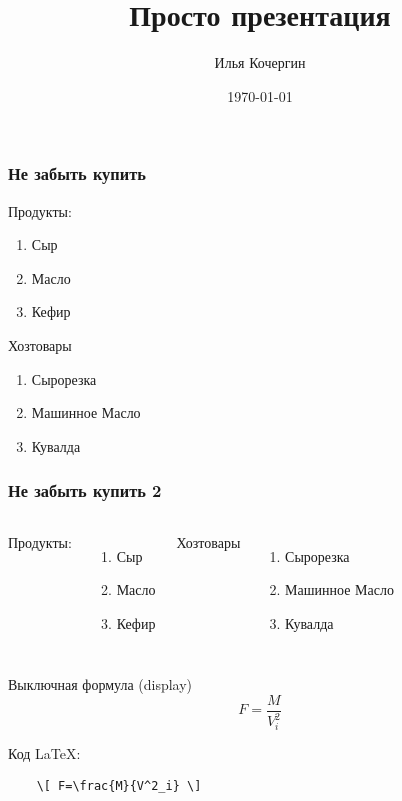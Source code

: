 \documentclass{beamer}
\author{Илья Кочергин}
\date{\today}
\title{Просто презентация}
\begin{document}
	
\begin{frame}
	\titlepage
\end{frame}	


\begin{frame}
	
\frametitle{Не забыть купить}


Продукты:

\begin{enumerate}
	\item Сыр
	\item Масло
	\item Кефир
\end{enumerate}

Хозтовары

\begin{enumerate}
	\item Сырорезка
	\item Машинное Масло
	\item Кувалда
\end{enumerate}

\end{frame}

\begin{frame}
	
	\frametitle{Не забыть купить 2}
\begin{columns}	

	

	
	Продукты:
	
	\begin{enumerate}
		\item Сыр
		\item Масло
		\item Кефир
	\end{enumerate}


	Хозтовары
	
	\begin{enumerate}
		\item Сырорезка
		\item Машинное Масло
		\item Кувалда
	\end{enumerate}
\end{columns}	
	
\end{frame}

\begin{frame}[fragile]
	Выключная формула (display)
		\[ F=\frac{M}{V^2_i} \]

Код \LaTeX:
		
	\begin{verbatim}
	\[ F=\frac{M}{V^2_i} \]
		
	\end{verbatim}
\end{frame}
\end{document}
